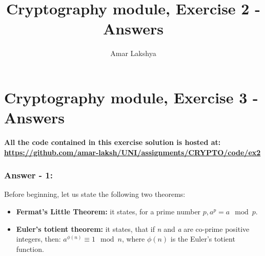 \documentclass[10pt,a4paper,oneside]{article}
\author{Amar Lakshya}
\title{Cryptography module, Exercise 2 - Answers}
\begin{document}
\part*{Cryptography module, Exercise 3 - Answers}

\textbf{All the code contained in this exercise solution is hosted at:\linebreak
\href{https://github.com/amar-laksh/UNI/tree/master/assignments/CRYPTO/code/ex2}
{https://github.com/amar-laksh/UNI/assignments/CRYPTO/code/ex2}}
\section*{Answer - 1:}
Before beginning, let us state the following two theorems:
\begin{itemize}
\item \textbf{Fermat's Little Theorem:} it states, for a prime number \( p, a^p = a \mod p \). 
\item \textbf{Euler's totient theorem:} it states, that if \textit{n} and \textit{a} are co-prime positive integers, then: \( a^{\phi(n)} \equiv 1 \mod n \), where \( \phi (n) \) is the Euler's totient function.
\end{itemize}
\end{document}
